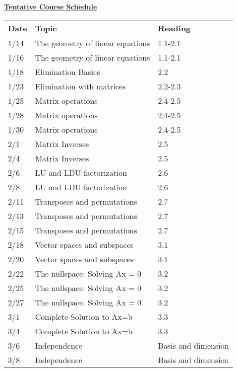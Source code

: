 \documentclass[11pt, a4paper]{article}
\begin{document}
\centerline{\Large \underline{\textbf{Tentative Course Schedule}}}
\vspace{5pt}
\small
\begin{tabular}{ |p{0.5in}|p{4.0in}|p{1.0in}| }
\hline
   \textbf{Date} & \textbf{Topic} & \textbf{Reading}  \\ \hline
1/14 & The geometry of linear equations &  1.1-2.1 \\ \hline
1/16 & The geometry of linear equations &  1.1-2.1 \\ \hline
1/18 & Elimination Basics &  2.2 \\ \hline
1/23 & Elimination with matrices &  2.2-2.3 \\ \hline
1/25 & Matrix operations &  2.4-2.5﻿ \\ \hline
1/28 & Matrix operations &  2.4-2.5﻿ \\ \hline
1/30 & Matrix operations &  2.4-2.5﻿ \\ \hline
2/1 & Matrix Inverses &  2.5 \\ \hline
2/4 & Matrix Inverses &  2.5 \\ \hline
2/6 & LU and LDU factorization &  2.6﻿ \\ \hline
2/8 & LU and LDU factorization &  2.6﻿ \\ \hline
2/11 & Transposes and permutations &  2.7﻿ \\ \hline
2/13 & Transposes and permutations &  2.7﻿ \\ \hline
2/15 & Transposes and permutations &  2.7﻿ \\ \hline
2/18 & Vector spaces and subspaces &  3.1﻿ \\ \hline
2/20 & Vector spaces and subspaces &  3.1﻿ \\ \hline
2/22 & The nullspace: Solving Ax = 0 &  3.2﻿ \\ \hline
2/25 & The nullspace: Solving Ax = 0 &  3.2﻿ \\ \hline
2/27 & The nullspace: Solving Ax = 0 &  3.2﻿ \\ \hline
3/1 & Complete Solution to Ax=b &  3.3 \\ \hline
3/4 & Complete Solution to Ax=b &  3.3 \\ \hline
3/6 & Independence &  Basis and dimension \\ \hline
3/8 & Independence &  Basis and dimension \\ \hline
\end{tabular}

\newpage
\end{document}
